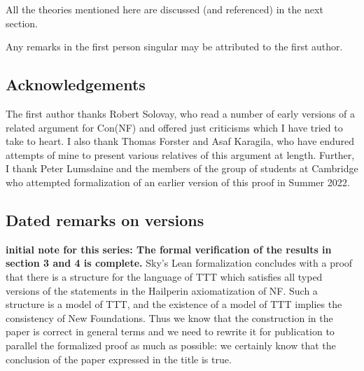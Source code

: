 \documentclass[112pt]{article}
\begin{document}
All the theories mentioned here are discussed (and referenced) in the next section.

Any remarks in the first person singular may be attributed to the first author.

\subsection{Acknowledgements}

The first author thanks Robert Solovay, who read a number of early versions of a related argument for Con(NF) and offered just criticisms which I have tried to take to heart.  I also thank Thomas Forster and Asaf Karagila, who have endured attempts of mine to present various relatives of this argument at length.  Further, I thank Peter Lumsdaine
and the members of the group of students at Cambridge who attempted formalization of an earlier version of this proof in Summer 2022.
\begin{comment}
Thomas suggests thanking those who funded the first Lean effort. Queens,
DPMMS and - more importantly - The Wes and Margaret foundation put up
money. I should also thank Timothy Chow for promoting the 2022 activity.
\end{comment}

\subsection{Dated remarks on versions}

{\bf initial note for this series:  The formal verification of the results in section 3 and 4 is complete.} Sky's Lean formalization concludes with a proof that there is a structure for the language of TTT which satisfies all typed versions of the statements
in the Hailperin axiomatization of NF.  Such a structure is a model of TTT, and the existence of a model of TTT implies the consistency of New Foundations.  Thus we know that the construction in the paper is correct in general terms and we need to rewrite it for publication to parallel the formalized proof as much as possible:  we certainly know that the conclusion of the paper expressed in the title is true.
\end{document}
